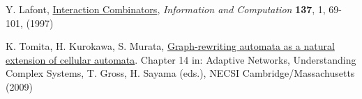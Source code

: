 \documentclass{article}
\begin{document}
\begin{thebibliography}{99}









 Y. Lafont, \href{https://pdfs.semanticscholar.org/6cfe/09aa6e5da6ce98077b7a048cb1badd78cc76.pdf}{Interaction Combinators}, {\it Information and Computation} {\bf 137}, 1, 69-101, (1997)




 K. Tomita, H. Kurokawa, S. Murata, \href{https://link.springer.com/chapter/10.1007/978-3-642-01284-6_14}{Graph-rewriting automata as a natural extension of cellular automata}. Chapter 14 in: Adaptive Networks, Understanding Complex Systems, T. Gross, H. Sayama (eds.), NECSI Cambridge/Massachusetts (2009)

\end{thebibliography}
\vspace{.5cm}
\end{document}
